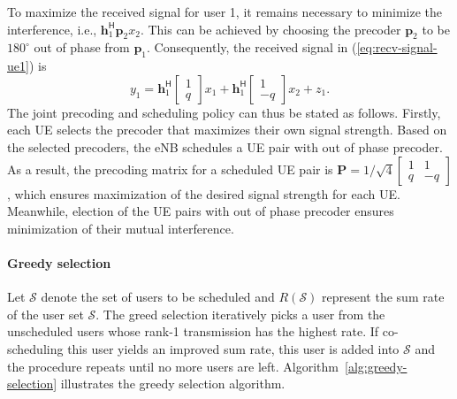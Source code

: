 \documentclass[a4paper,12pt]{article}%
\begin{document}
To maximize the received signal for user 1, it remains necessary to minimize the interference, i.e., $\bm{h}_1^{\mathsf{H}} \mathbf{p}_2 x_2$. This can be achieved by choosing the precoder $\mathbf{p}_2$ to be $180^\circ$ out of phase from $\mathbf{p}_1$. Consequently, the received signal in (\ref{eq:recv-signal-ue1}) is
\begin{equation}
y_{1} = \bm{h}^{\mathsf{H}}_{1} \begin{bmatrix} 1 \\ q \end{bmatrix} x_{1} + \bm{h}^{\mathsf{H}}_{1} \begin{bmatrix} 1 \\ -q \end{bmatrix} x_{2} + z_{1}.
\end{equation}
The joint precoding and scheduling policy can thus be stated as follows. Firstly, each UE selects the precoder that maximizes their own signal strength. Based on the selected precoders, the eNB schedules a UE pair with out of phase precoder. As a result, the precoding matrix for a scheduled UE pair is $\mathbf{P}=1/\sqrt{4}\begin{bmatrix} 1 & 1\\ q & -q \end{bmatrix}$, which ensures maximization of the desired signal strength for each UE. Meanwhile, election of the UE pairs with out of phase precoder ensures minimization of their mutual interference.


\paragraph{Greedy selection}

Let $\mathcal{S}$ denote the set of users to be scheduled and $R(\mathcal{S})$ represent the sum rate of the user set $\mathcal{S}$. The greed selection iteratively picks a user from the unscheduled users whose rank-1 transmission has the highest rate. If co-scheduling this user yields an improved sum rate, this user is added into $\mathcal{S}$ and the procedure repeats until no more users are left. Algorithm~\ref{alg:greedy-selection} illustrates the greedy selection algorithm.

\begin{spacing}{0.8}
\end{spacing}
\end{document}
